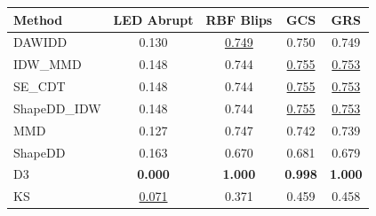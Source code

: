 \begin{tabular}{|l|c|c|c|c|}
\hline
\textbf{Method} & \textbf{LED Abrupt} & \textbf{RBF Blips} & \textbf{GCS} & \textbf{GRS} \\
\hline
DAWIDD & 0.130 & \underline{0.749} & 0.750 & 0.749 \\
IDW\_MMD & 0.148 & 0.744 & \underline{0.755} & \underline{0.753} \\
SE\_CDT & 0.148 & 0.744 & \underline{0.755} & \underline{0.753} \\
ShapeDD\_IDW & 0.148 & 0.744 & \underline{0.755} & \underline{0.753} \\
MMD & 0.127 & 0.747 & 0.742 & 0.739 \\
ShapeDD & 0.163 & 0.670 & 0.681 & 0.679 \\
D3 & \textbf{0.000} & \textbf{1.000} & \textbf{0.998} & \textbf{1.000} \\
KS & \underline{0.071} & 0.371 & 0.459 & 0.458 \\
\hline
\end{tabular}